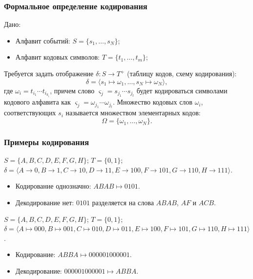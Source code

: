 \begin{frame}
    \frametitle{Формальное определение кодирования}
    
    \begin{definition}
        Дано:
        \begin{itemize}
            \item Алфавит \alert{событий}: $S=\{s_1,\ldots,s_N\}$;
            \item Алфавит кодовых \alert{символов}: $T=\{t_1,\ldots,t_m\}$;
        \end{itemize}
        
        Требуется задать отображение $\delta:S\to T^{+}$ (таблицу кодов, \alert{схему кодирования}):
        \[
            \delta=\langle s_1\mapsto \omega_1,\ldots,s_N\mapsto \omega_N\rangle,
        \]
        где $\omega_i=t_{i_1}\cdots t_{i_{k_i}}$, причем слово $\varsigma_j=s_{j_1}\cdots s_{j_t}$ будет кодироваться символами кодового алфавита как $\varsigma_j=\omega_{j_1}\cdots \omega_{j_t}$.
        Множество кодовых слов $\omega_i$, соответствующих $s_i$ называется множеством \alert{элементарных} кодов:
        \[\Omega=\{\omega_1,\ldots,\omega_N\}.\]
    \end{definition} 
\end{frame}

\begin{frame}
    \frametitle{Примеры кодирования}

    \begin{example}
        $S=\{A,B,C,D,E,F,G,H\}$; $T=\{0,1\}$; $\delta=\langle A\to 0,B\to 1,C\to 10,D\to 11,E\to 100,F\to 101,G\to 110,H\to 111 \rangle$. 
        \begin{itemize}
            \item Кодирование однозначно: $ABAB\mapsto 0101$. 
            \item Декодирование нет: $0101$ разделяется на слова $ABAB$, $AF$ и $ACB$.
        \end{itemize}
    \end{example} 

    \begin{example}
        $S=\{A,B,C,D,E,F,G,H\}$; $T=\{0,1\}$; $\delta=\langle A\mapsto 000, B\mapsto 001, C\mapsto 010, D\mapsto 011, E\mapsto 100, F\mapsto 101, G\mapsto 110, H\mapsto 111 \rangle$.
        
        \begin{itemize}
            \item Кодирование: $ABBA\mapsto 000001000001$. 
            \item Декодирование: $000 001 000 001\mapsto ABBA$.
        \end{itemize}
    \end{example} 
\end{frame}

